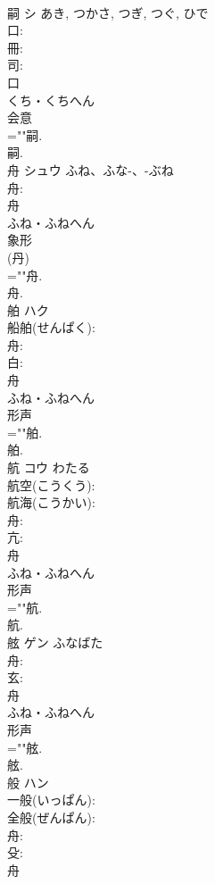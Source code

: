 \documentclass[8pt]{extreport}
\begin{document}
\begin{CJK}{UTF8}{min}
\\	嗣	シ		あき, つかさ, つぎ, つぐ, ひで	
\\	口: 
\\	冊: 
\\	司: 
\\	口	
\\	くち・くちへん	
\\	会意 
\\	=""嗣.
\\	嗣.
\\	舟	シュウ	ふね、ふな-、-ぶね		
\\	舟: 
\\	舟	
\\	ふね・ふねへん	
\\	象形 
\\	(丹) 
\\	=""舟.
\\	舟.
\\	舶	ハク			
\\	船舶(せんぱく): 
\\	舟: 
\\	白: 
\\	舟	
\\	ふね・ふねへん	
\\	形声 
\\	=""舶.
\\	舶.
\\	航	コウ		わたる	
\\	航空(こうくう): 
\\	航海(こうかい): 
\\	舟: 
\\	亢: 
\\	舟	
\\	ふね・ふねへん	
\\	形声 
\\	=""航.
\\	航.
\\	舷	ゲン	ふなばた		
\\	舟: 
\\	玄: 
\\	舟	
\\	ふね・ふねへん	
\\	形声 
\\	=""舷.
\\	舷.
\\	般	ハン			
\\	一般(いっぱん): 
\\	全般(ぜんぱん): 
\\	舟: 
\\	殳: 
\\	舟	

\end{CJK}
\end{document}
